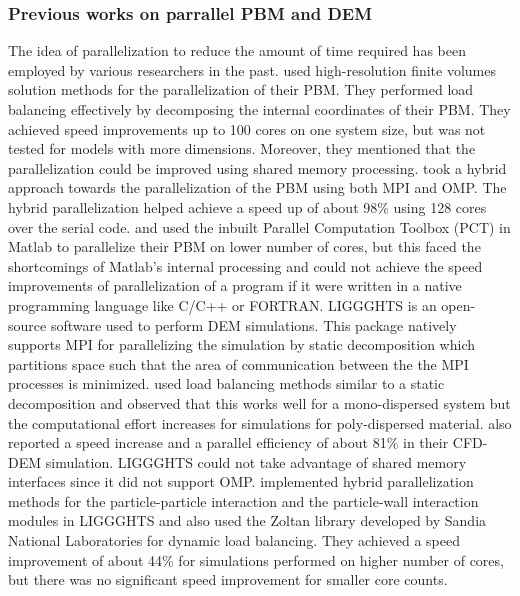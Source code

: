 \documentclass[preprint,11pt,authoryear]{elsarticle}
\begin{document}
\subsubsection{Previous works on parrallel PBM and DEM}
  The idea of parallelization to reduce the amount of time required has been employed by various 
researchers in the past. \cite{Gunawan2008} used high-resolution finite volumes solution methods for 
the parallelization of their PBM. They performed load balancing effectively by 
decomposing the internal coordinates of their PBM. They achieved speed improvements up to 100 
cores on one system size, but was not tested for models with more dimensions. Moreover, they 
mentioned that the parallelization could be improved using shared memory processing. 
\cite{Bettencourt2017} took a hybrid approach towards the parallelization of the PBM using both 
MPI and OMP. The hybrid parallelization helped achieve 
a speed up of about 98\% using 128 cores over the serial code. \cite{Prakash2013a} and \cite{Prakash2013b} 
used the inbuilt Parallel Computation Toolbox (PCT) in Matlab \citep{pctMatlab} to parallelize their PBM on lower number 
of cores, but this faced the shortcomings of Matlab's internal processing and could not achieve the 
speed improvements of parallelization of a program if it were written in a native programming language 
like C/C++ or FORTRAN. 
  LIGGGHTS is an open-source software used to perform DEM simulations. This package natively 
supports MPI for parallelizing the simulation by static decomposition which partitions space such that 
the area of communication between the the MPI processes is minimized. \cite{kacianauskas2010} used 
load balancing methods similar to a static decomposition and observed that this works well for a 
mono-dispersed system but the computational effort increases for simulations for poly-dispersed 
material. \cite{Gopalakrishnan2013} also reported a speed increase and a parallel efficiency of about 
81\% in their CFD-DEM simulation. LIGGGHTS could not take advantage of shared memory interfaces 
since it did not support OMP. \cite{Berger2015} implemented hybrid parallelization methods for the 
particle-particle interaction and the particle-wall interaction modules in LIGGGHTS and also used the 
Zoltan library \citep{Boman2012} developed by Sandia National Laboratories for dynamic load 
balancing. They achieved a speed improvement of about 44\% for simulations performed on higher 
number of cores, but there was no significant speed improvement for smaller core counts. 
\end{document}
